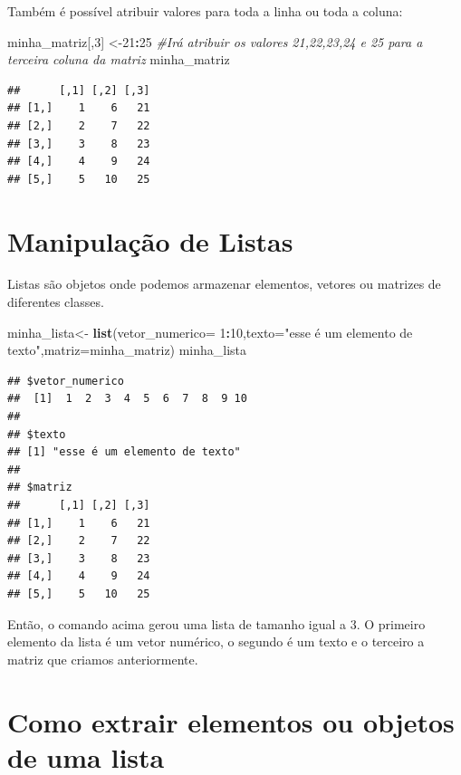 \documentclass[
]{book}
\newenvironment{Shaded}{\begin{snugshade}}{\end{snugshade}}
\newcommand{\CommentTok}[1]{\textcolor[rgb]{0.56,0.35,0.01}{\textit{#1}}}
\newcommand{\DataTypeTok}[1]{\textcolor[rgb]{0.13,0.29,0.53}{#1}}
\newcommand{\DecValTok}[1]{\textcolor[rgb]{0.00,0.00,0.81}{#1}}
\newcommand{\KeywordTok}[1]{\textcolor[rgb]{0.13,0.29,0.53}{\textbf{#1}}}
\newcommand{\NormalTok}[1]{#1}
\newcommand{\OperatorTok}[1]{\textcolor[rgb]{0.81,0.36,0.00}{\textbf{#1}}}
\newcommand{\StringTok}[1]{\textcolor[rgb]{0.31,0.60,0.02}{#1}}
\begin{document}
Também é possível atribuir valores para toda a linha ou toda a coluna:

\begin{Shaded}
\begin{Highlighting}[]
\NormalTok{minha_matriz[,}\DecValTok{3}\NormalTok{] <-}\DecValTok{21}\OperatorTok{:}\DecValTok{25}   \CommentTok{#Irá atribuir os valores 21,22,23,24 e 25 para a terceira coluna da matriz}
\NormalTok{minha_matriz}
\end{Highlighting}
\end{Shaded}

\begin{verbatim}
##      [,1] [,2] [,3]
## [1,]    1    6   21
## [2,]    2    7   22
## [3,]    3    8   23
## [4,]    4    9   24
## [5,]    5   10   25
\end{verbatim}

\hypertarget{manipulauxe7uxe3o-de-listas}{%
\section{Manipulação de Listas}\label{manipulauxe7uxe3o-de-listas}}

Listas são objetos onde podemos armazenar elementos, vetores ou matrizes
de diferentes classes.

\begin{Shaded}
\begin{Highlighting}[]
\NormalTok{minha_lista<-}\StringTok{ }\KeywordTok{list}\NormalTok{(}\DataTypeTok{vetor_numerico=} \DecValTok{1}\OperatorTok{:}\DecValTok{10}\NormalTok{,}\DataTypeTok{texto=}\StringTok{"esse é um elemento de texto"}\NormalTok{,}\DataTypeTok{matriz=}\NormalTok{minha_matriz)}
\NormalTok{minha_lista}
\end{Highlighting}
\end{Shaded}

\begin{verbatim}
## $vetor_numerico
##  [1]  1  2  3  4  5  6  7  8  9 10
## 
## $texto
## [1] "esse é um elemento de texto"
## 
## $matriz
##      [,1] [,2] [,3]
## [1,]    1    6   21
## [2,]    2    7   22
## [3,]    3    8   23
## [4,]    4    9   24
## [5,]    5   10   25
\end{verbatim}

Então, o comando acima gerou uma lista de tamanho igual a 3. O primeiro
elemento da lista é um vetor numérico, o segundo é um texto e o terceiro
a matriz que criamos anteriormente.

\hypertarget{como-extrair-elementos-ou-objetos-de-uma-lista}{%
\section{Como extrair elementos ou objetos de uma
lista}\label{como-extrair-elementos-ou-objetos-de-uma-lista}}
\end{document}
